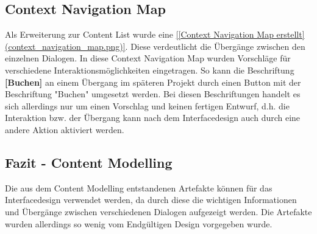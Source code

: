 \subsection{Context Navigation Map}
\label{sec:Context Navigation Map}

Als Erweiterung zur Content List wurde eine \ref{[Context Navigation Map erstellt](context_navigation_map.png)}.
Diese verdeutlicht die Übergänge zwischen den einzelnen Dialogen. In diese
Context Navigation Map wurden Vorschläge für verschiedene
Interaktionsmöglichkeiten eingetragen. So kann die Beschriftung \textbf{[Buchen]} an
einem Übergang im späteren Projekt durch einen Button mit der Beschriftung
"Buchen" umgesetzt werden. Bei diesen Beschriftungen handelt es sich allerdings
nur um einen Vorschlag und keinen fertigen Entwurf, d.h. die Interaktion bzw.
der Übergang kann nach dem Interfacedesign auch durch eine andere Aktion
aktiviert werden.


\subsection{Fazit - Content Modelling}
\label{sec:Fazit - Content Modelling}

Die aus dem Content Modelling entstandenen Artefakte können für das
Interfacedesign verwendet werden, da durch diese die wichtigen Informationen
und Übergänge zwischen verschiedenen Dialogen aufgezeigt werden. Die Artefakte
wurden allerdings so wenig vom Endgültigen Design vorgegeben wurde.




















